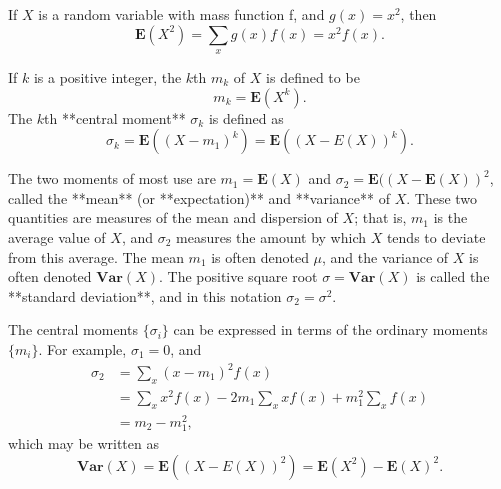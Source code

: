 \begin{example}
If $X$ is a random variable with mass function f, and $g(x) = x^2$, then 
\begin{equation*}
    \mathbf{E}(X^2) = \sum_x g(x)f(x) = x^2 f(x).
\end{equation*}
\end{example}

\begin{definition}
If $k$ is a positive integer, the $k$th  $m_k$ of $X$ is defined to be 
\begin{equation*}
    m_k = \mathbf{E}(X^k).
\end{equation*}
The $k$th **central moment** $\sigma_k$ is defined as
\begin{equation*}
    \sigma_k = \mathbf{E}\left( (X-m_1)^k \right) = \mathbf{E}\left( (X-E(X))^k \right).
\end{equation*} 
\end{definition}

The two moments of most use are $m_1 = \mathbf{E}(X)$ and $\sigma_2 = \mathbf{E}( (X - \mathbf{E}(X))^2$, called the **mean** (or **expectation)** and **variance** of $X$. These two quantities are measures of the mean and dispersion of $X$; that is, $m_1$ is the average value of $X$, and $\sigma_2$ measures the amount by which $X$ tends to deviate from this average. The mean $m_1$ is often denoted $\mu$, and the variance of $X$ is often denoted $\mathbf{Var}(X)$. The positive square root $\sigma = \mathbf{Var}(X)$ is called the **standard deviation**, and in this notation $\sigma_2 = \sigma^2$. 

The central moments $\{\sigma_i\}$ can be expressed in terms of the ordinary moments $\{m_i\}$. For example, $\sigma_1 = 0$, and 
\begin{equation*}
    \begin{aligned} 
        \sigma_{2} &=\sum_{x}\left(x-m_{1}\right)^{2} f(x) \\ 
        &=\sum_{x} x^{2} f(x)-2 m_{1} \sum_{x} x f(x)+m_{1}^{2} \sum_{x} f(x) \\ 
        &=m_{2}-m_{1}^{2} ,
    \end{aligned}
\end{equation*}
which may be written as 
\begin{equation}
    \label{eq:4-1}
    \tag{4-1}
    \mathbf{Var}(X) = \mathbf{E}\left( (X-E(X))^2 \right) = \mathbf{E}(X^2) - \mathbf{E}(X)^2.
\end{equation}

